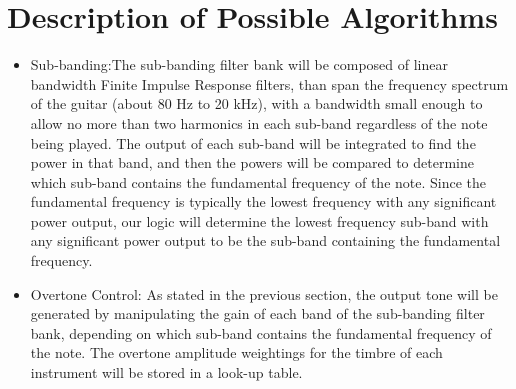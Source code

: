 \documentclass{article}
\begin{document}
\section{Description of Possible Algorithms}
\begin{itemize}
	\item Sub-banding:The sub-banding filter bank will be composed of linear bandwidth Finite Impulse Response filters, than span the frequency spectrum of the guitar (about 80 Hz to 20 kHz), with a bandwidth small enough to allow no more than two harmonics in each sub-band regardless of the note being played. The output of each sub-band will be integrated to find the power in that band, and then the powers will be compared to determine which sub-band contains the fundamental frequency of the note. Since the fundamental frequency is typically the lowest frequency with any significant power output, our logic will determine the lowest frequency sub-band with any significant power output to be the sub-band containing the fundamental frequency.
   
	\item Overtone Control: As stated in the previous section, the output tone will be generated by manipulating the gain of each band of the sub-banding filter bank, depending on which sub-band contains the fundamental frequency of the note. The overtone amplitude weightings for the timbre of each instrument will be stored in a look-up table.
    

\end{itemize}
\end{document}

